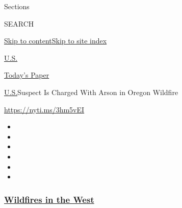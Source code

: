 Sections

SEARCH

\protect\hyperlink{site-content}{Skip to
content}\protect\hyperlink{site-index}{Skip to site index}

\href{https://www.nytimes3xbfgragh.onion/section/us}{U.S.}

\href{https://myaccount.nytimes3xbfgragh.onion/auth/login?response_type=cookie\&client_id=vi}{}

\href{https://www.nytimes3xbfgragh.onion/section/todayspaper}{Today's
Paper}

\href{/section/us}{U.S.}\textbar{}Suspect Is Charged With Arson in
Oregon Wildfire

\url{https://nyti.ms/3hm5vEI}

\begin{itemize}
\item
\item
\item
\item
\item
\item
\end{itemize}

\hypertarget{wildfires-in-the-west}{%
\subsubsection{\texorpdfstring{\href{https://www.nytimes3xbfgragh.onion/spotlight/california-wildfires?name=styln-california-wildfires\&region=TOP_BANNER\&block=storyline_menu_recirc\&action=click\&pgtype=Article\&impression_id=d7e50210-f52b-11ea-b1f6-7dcd7185e0b5\&variant=undefined}{Wildfires
in the West}}{Wildfires in the West}}\label{wildfires-in-the-west}}

